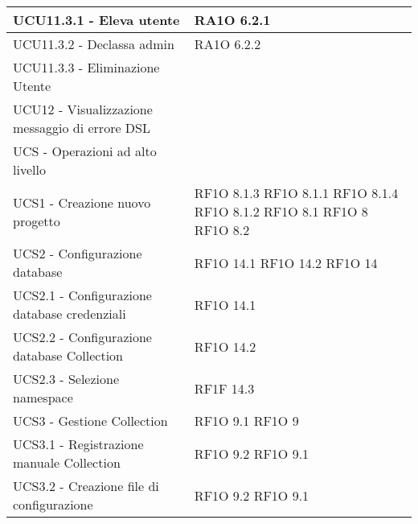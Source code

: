 \begin{center}
\begin{longtable}{ | p{5cm} | p{5cm} |}
            UCU11.3.1 - Eleva utente &  RA1O 6.2.1 \newline  \\ \hline      
            UCU11.3.2 - Declassa admin &  RA1O 6.2.2 \newline  \\ \hline      
            UCU11.3.3 - Eliminazione Utente &  \\ \hline      
            UCU12 - Visualizzazione messaggio di errore DSL &  \\ \hline      
            UCS - Operazioni ad alto livello &  \\ \hline      
            UCS1 - Creazione nuovo progetto &  RF1O 8.1.3  \newline  RF1O 8.1.1  \newline  RF1O 8.1.4  \newline  RF1O 8.1.2 \newline  RF1O 8.1  \newline  RF1O 8  \newline  RF1O 8.2  \newline  \\ \hline      
            UCS2 - Configurazione database &  RF1O 14.1 \newline  RF1O 14.2 \newline  RF1O 14 \newline  \\ \hline      
            UCS2.1 - Configurazione database credenziali &  RF1O 14.1 \newline  \\ \hline      
            UCS2.2 - Configurazione database Collection &  RF1O 14.2 \newline  \\ \hline      
            UCS2.3 - Selezione namespace &  RF1F 14.3 \newline  \\ \hline      
            UCS3 - Gestione Collection &  RF1O 9.1  \newline  RF1O 9  \newline  \\ \hline      
            UCS3.1 - Registrazione manuale Collection &  RF1O 9.2 \newline  RF1O 9.1  \newline  \\ \hline      
            UCS3.2 - Creazione file di configurazione &  RF1O 9.2 \newline  RF1O 9.1  \newline  \\ \hline      

\end{longtable}
\end{center}
